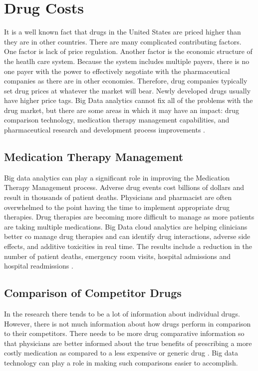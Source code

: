 \documentclass[sigconf]{acmart}
\begin{document}
\section{Drug Costs}
It is a well known fact that drugs in the United States are priced higher than they are in other countries.  There are many complicated contributing factors. One factor is lack of price regulation. Another factor is the economic structure of the heatlh care system.  Because the system includes multiple payers, there is no one payer with the power to effectively negotiate with the pharmaceutical companies as there are in other economies. Therefore, drug companies typically set drug prices at whatever the market will bear.  Newly developed drugs usually have higher price tags.  Big Data analytics cannot fix all of the problems with the drug market, but there are some areas in which it may have an impact:  drug comparison technology, medication therapy management capabilities, and pharmaceutical research and development process improvements \cite{www-google-drug}.

\subsection{Medication Therapy Management}
Big data analytics can play a significant role in improving the Medication Therapy Management process.  Adverse drug events cost billions of dollars and result in thousands of patient deaths.  Physicians and pharmacist are often overwhelmed to the point having the time to implement appropriate drug therapies. Drug therapies are becoming more difficult to manage as more patients are taking multiple medications.  Big Data cloud analytics are helping clinicians better co manage drug therapies and can identify drug interactions, adverse side effects, and additive toxicities in real time. The results include a  reduction in the number of patient deaths, emergency room visits, hospital admissions and hospital readmissions \cite{www-google-data}.

\subsection{Comparison of Competitor Drugs}
In the research there tends to be a lot of information about individual drugs. However, there is not much information about how drugs perform in comparison to their competitors.  There needs to be more drug comparative information so that physicians are better informed about the true benefits of prescribing a more costly medication as compared to a less expensive or generic drug \cite{www-google-drug}. Big data technology can play a role in making such comparisons easier to accomplish. 
\end{document}
